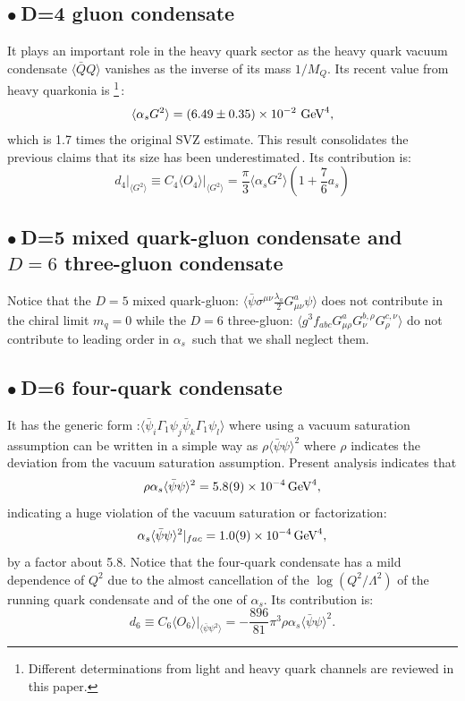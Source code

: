 \documentclass[review]{elsarticle}
\def\beq{\begin{equation}}
\def\eeq{\end{equation}}
\def\ga{\left(}
\def\dr{\right)}
\def\la{\langle}
\def\ra{\rangle}
\def\b{$\bullet~$}
\begin{document}
\subsection*{\b  D=4 gluon condensate}
 It plays an important role in the heavy quark sector as the heavy quark vacuum condensate $\la\bar QQ\ra$ vanishes 
 as the inverse of its mass $1/M_Q$. Its  recent value from heavy quarkonia is\,\cite{SNparam}\,\footnote{Different determinations from light and heavy quark channels are reviewed in this paper.}\,:
\beq
\la\alpha_s G^2\ra= (6.49\pm 0.35)\times 10^{-2}~{\rm GeV}^4,
\label{eq:asg2}
\eeq
which is 1.7 times the original SVZ estimate. This result consolidates the previous claims that its size has been underestimated\,\cite{BELLa,BERTa,FESR,LNT}. 
Its contribution  is:
\beq
d_4\vert_{\la G^2\ra}\equiv C_4\la O_4\ra\vert_{\la G^2\ra}=\frac{\pi}{3}\la\alpha_s G^2\ra \ga 1+\frac{7}{6}a_s\dr 
\eeq
\subsection*{\b  D=5 mixed quark-gluon condensate and $D=6$ three-gluon condensate}
Notice that the $D=5$ mixed quark-gluon: $\la\bar\psi\sigma^{\mu\nu}\frac{\lambda_a}{2}G_{\mu\nu}^a\psi\ra$ does not contribute in the chiral limit $m_q=0$ while the
$D=6$  three-gluon:   $ \la g^3f_{abc} G^a_{\mu\rho}G^{b,\rho}_{\nu}G^{c,\nu}_\rho\ra$ do not contribute to leading order in $\alpha_s$\,\cite{MALLIK} such that we shall neglect them.

\subsection*{\b  D=6 four-quark condensate }
It has the generic form :$\la\bar\psi_i\Gamma_1\psi_j\bar\psi_k\Gamma_1\psi_l\ra$ where using a  vacuum saturation 
assumption can be written in a simple way as $\rho\la\bar\psi\psi\ra^2 $ where $\rho$ indicates the deviation from the vacuum saturation assumption. Present analysis indicates that 
\beq
\rho\alpha_s\la\bar\psi\psi\ra^2 = 5.8(9)\times 10^{-4}\,{\rm GeV}^4,
\label{eq:psi2}
\eeq
indicating a huge violation of the vacuum saturation or factorization:
\beq
\alpha_s\la\bar\psi\psi\ra^2\vert_{fac} = 1.0(9)\times 10^{-4}\,{\rm GeV}^4,
\label{eq:fac}
\eeq
by a factor about 5.8. Notice that the four-quark condensate has a mild dependence of $Q^2$ due to the almost cancellation of the $\log(Q^2/\Lambda^2)$ of the running quark condensate and of the one of $\alpha_s$. Its contribution is:
\beq
d_6\equiv C_6\la O_6\ra\vert_{\la\bar\psi\psi^2\ra}= -\frac{896}{81}\pi^3\rho\alpha_s\la\bar \psi\psi\ra^2.
\label{eq:d6}
\eeq
\end{document}
